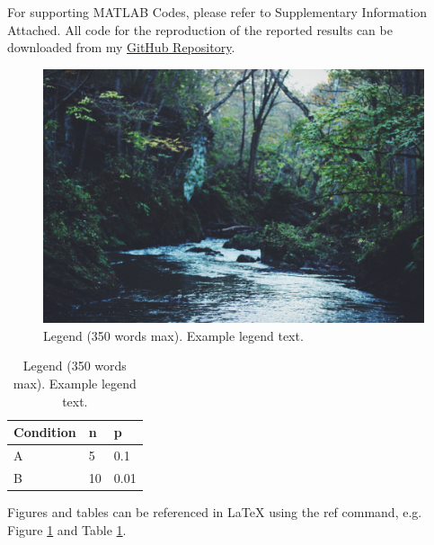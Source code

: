 \documentclass[fleqn,10pt]{wlscirep}
\begin{document}
For supporting MATLAB Codes, please refer to Supplementary Information Attached. All code for the reproduction of the reported results can be downloaded from my \href{https://github.com/doerlbh/RNAi_CME_Dynamics}{GitHub Repository}.

\begin{figure}[ht]
\centering
\includegraphics[width=\linewidth]{stream}
\caption{Legend (350 words max). Example legend text.}
\label{fig:stream}
\end{figure}

\begin{table}[ht]
\centering
\begin{tabular}{|l|l|l|}
\hline
Condition & n & p \\
\hline
A & 5 & 0.1 \\
\hline
B & 10 & 0.01 \\
\hline
\end{tabular}
\caption{\label{tab:example}Legend (350 words max). Example legend text.}
\end{table}

Figures and tables can be referenced in LaTeX using the ref command, e.g. Figure \ref{fig:stream} and Table \ref{tab:example}.
\end{document}
